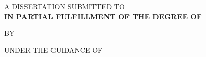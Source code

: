 \makeatletter
\begin{titlepage}
    \begin{center}
        \LARGE{\textbf{\MakeUppercase{\@title}}}
        
        \vspace{50pt}
        \large
        \uppercase{A dissertation submitted to}\\
        \vspace{10pt}
        \textbf{\MakeTextUppercase{\@institution\space in partial fulfillment of the degree of}}\\
        \vspace{12pt}
        \Large
        \textbf{\MakeTextUppercase{\@course}}
        
        \vspace{1.5cm}
        \large
        BY\\
        \Large
        \textbf{\MakeTextUppercase{\@author}}
        
        \vspace{60pt}
        
        \large
        \uppercase{Under the guidance of}\\
        \Large
        \textbf{\@guide}
        
        \large
        \vspace{66pt}
        \MakeTextUppercase{\@department}

        \vspace{60pt}
        \textbf{\MakeTextUppercase{\@date}}
    \end{center}
\end{titlepage}
\makeatother